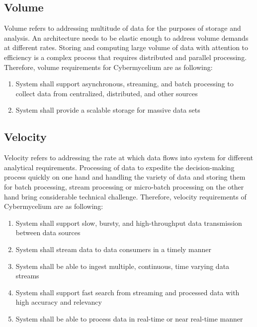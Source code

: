 \documentclass{bmcart}
\begin{document}

\subsection{Volume}

Volume refers to addressing multitude of data for the purposes of storage and analysis. An architecture needs to be elastic enough to address volume demands at different rates. Storing and computing large volume of data with attention to efficiency is a complex process that requires distributed and parallel processing. Therefore, volume requirements for Cybermycelium are as following:


\begin{enumerate}[label=\textbf{Vol-\arabic*}]
    \item System shall support asynchronous, streaming, and batch processing to collect data from centralized, distributed, and other sources
    \item System shall provide a scalable storage for massive data sets
\end{enumerate}


\subsection{Velocity}

Velocity refers to addressing the rate at which data flows into system for different analytical requirements. Processing of data to expedite the decision-making process quickly on one hand and handling the variety of data and storing them for batch processing, stream processing or micro-batch processing on the other hand bring considerable technical challenge. Therefore, velocity requirements of Cybermycelium are as following: 

\begin{enumerate}[label=\textbf{Vel-\arabic*}]
    \item System shall support slow, bursty, and high-throughput data transmission between data sources
    \item System shall stream data to data consumers in a timely manner
    \item System shall be able to ingest multiple, continuous, time varying data streams
    \item System shall support fast search from streaming and processed data with high accuracy and relevancy
    \item System shall be able to process data in real-time or near real-time manner
\end{enumerate}
\end{document}
